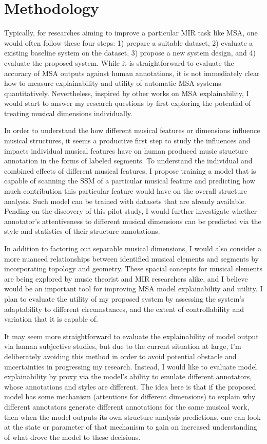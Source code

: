 \section{Methodology}
Typically, for researches aiming to improve a particular MIR task like MSA, one would often follow these four steps: 1) prepare a suitable dataset, 2) evaluate a existing baseline system on the dataset, 3) propose a new system design, and 4) evaluate the proposed system.
While it is straightforward to evaluate the accuracy of MSA outputs against human annotations, it is not immediately clear how to measure explainability and utility of automatic MSA systems quantitatively.
Nevertheless, inspired by other works on MSA explainability, I would start to answer my research questions by first exploring the potential of treating musical dimensions individually.

In order to understand the how different musical features or dimensions influence musical structures, it seems a productive first step to study the influences and impacts individual musical features have on human produced music structure annotation in the forms of labeled segments.
To understand the individual and combined effects of different musical features, I propose training a model that is capable of scanning the SSM of a particular musical feature and predicting how much contribution this particular feature would have on the overall structure analysis.
Such model can be trained with datasets that are already available.
Pending on the discovery of this pilot study, I would further investigate whether annotator's attentiveness to different musical dimensions can be predicted via the style and statistics of their structure annotations.

In addition to factoring out separable musical dimensions, I would also consider a more nuanced relationships between identified musical elements and segments by incorporating topology and geometry.
These spacial concepts for musical elements are being explored by music theorist and MIR researchers alike, and I believe would be an important tool for improving MSA model explainability and utility.
I plan to evaluate the utility of my proposed system by assessing the system's adaptability to different circumstances, and the extent of controllability and variation that it is capable of.

It may seem more straightforward to evaluate the explainability of model output via human subjective studies, but due to the current situation at large, I'm deliberately avoiding this method in order to avoid potential obstacle and uncertainties in progressing my research.
Instead, I would like to evaluate model explainability by proxy via the model's ability to emulate different annotators, whose annotations and styles are different.
The idea here is that if the proposed model has some mechanism (attentions for different dimensions) to explain why different annotators generate different annotations for the same musical work, then when the model outputs its own structure analysis predictions, one can look at the state or parameter of that mechanism to gain an increased understanding of what drove the model to these decisions.